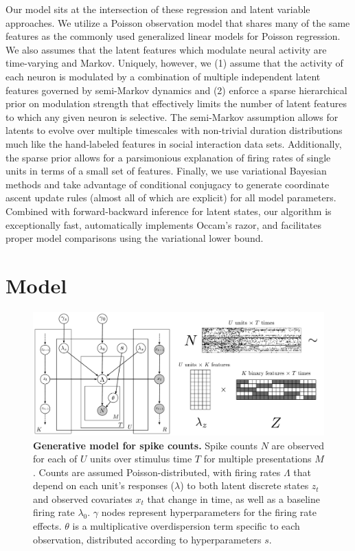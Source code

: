 \documentclass{article} %
\begin{document}
Our model sits at the intersection of these regression and latent variable approaches. We utilize a Poisson observation model that shares many of the same features as the commonly used generalized linear models for Poisson regression. We also assumes that the latent features which modulate neural activity are time-varying and Markov. Uniquely, however, we (1) assume that the activity of each neuron is modulated by a combination of multiple independent latent features governed by semi-Markov dynamics and (2) enforce a sparse hierarchical prior on modulation strength that effectively limits the number of latent features to which any given neuron is selective. The semi-Markov assumption allows for latents to evolve over multiple timescales with non-trivial duration distributions much like the hand-labeled features in social interaction data sets. Additionally, the sparse prior allows for a parsimonious explanation of firing rates of single units in terms of a small set of features. Finally, we use variational Bayesian methods and take advantage of conditional conjugacy to generate coordinate ascent update rules (almost all of which are explicit) for all model parameters. Combined with forward-backward inference for latent states, our algorithm is exceptionally fast, automatically implements Occam's razor, and facilitates proper model comparisons using the variational lower bound.   

\section{Model}
\label{model_sec}
\begin{figure}[ht]
    \includegraphics[width=1\linewidth]{figures/model}
    \caption{\textbf{Generative model for spike counts.} Spike counts $N$ are observed for each of $U$ units over stimulus time $T$ for multiple presentations $M$. Counts are assumed Poisson-distributed, with firing rates $\Lambda$ that depend on each unit's responses ($\lambda$) to both latent discrete states $z_t$ and observed covariates $x_t$ that change in time, as well as a baseline firing rate $\lambda_0$. $\gamma$ nodes represent hyperparameters for the firing rate effects. $\theta$ is a multiplicative overdispersion term specific to each observation, distributed according to hyperparameters $s$.}
\end{figure}
\end{document}
